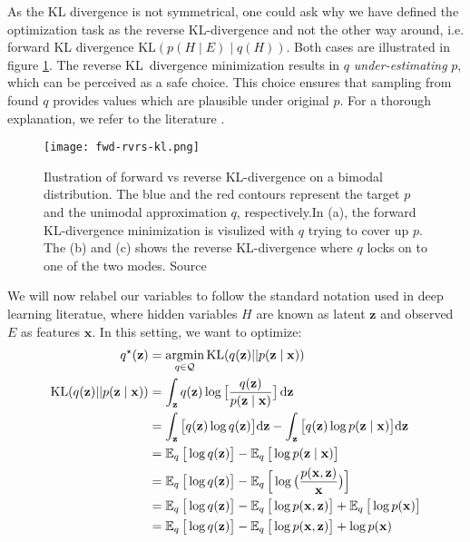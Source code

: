 As the KL divergence is not symmetrical, one could ask why we have defined the optimization task as the reverse KL-divergence and not the other way
around, i.e. forward KL divergence $\mathrm{KL}(p(H \mid E) \mid q(H))$. Both cases are illustrated in figure \ref{fig:forward-reverse}. The reverse 
KL~divergence minimization results in $q$ \textit{under-estimating} $p$, which can be perceived as a safe choice. This choice ensures that sampling
from found $q$ provides values which are plausible under original $p$. For a thorough explanation, we refer to the literature 
\cite{another-vb-intro-2021}.
\begin{figure}[t]
    \centering
    \texttt{[image: fwd-rvrs-kl.png]}
    \caption[Forward vs reverse KL divergence]{Ilustration of forward vs reverse KL-divergence on a bimodal distribution. The blue and the red contours represent the target $p$ 
    and the unimodal approximation $q$, respectively.In (a), the forward KL-divergence minimization is visulized with $q$ trying to cover up $p$.
    The (b) and (c) shows the reverse KL-divergence where $q$ locks on to one of the two modes. Source \cite{another-vb-intro-2021}}
    \label{fig:forward-reverse}
\end{figure}
We will now relabel our variables to follow
the standard notation used in deep learning literatue, where hidden variables $H$ are known as latent $\mathbf{z}$ and observed $E$ as features $\mathbf{x}$. 
In this setting, we want to optimize:
\begin{align}
    \label{eq:variational_bayes}
    q^\star(\mathbf{z}) &= \mathop{\rm argmin}_{q \in \mathcal{Q}} \mathrm{KL}(q(\mathbf{z}) || p(\mathbf{z} \mid \mathbf{x})) \\
    \mathrm{KL}(q(\mathbf{z}) || p(\mathbf{z} \mid \mathbf{x})) &= \int_\mathbf{z} q(\mathbf{z}) \log \big[ \frac{q(\mathbf{z})}{p(\mathbf{z}\mid\mathbf{x})} \big]\,\mbox{\rm d}\mathbf{z} \\
    &= \int_\mathbf{z} \big[q(\mathbf{z}) \log q(\mathbf{z})\big] \mbox{\rm d}\mathbf{z} - \int_\mathbf{z}  \big[q(\mathbf{z}) \log p(\mathbf{z}\mid \mathbf{x})\big] \mbox{\rm d}\mathbf{z} \\
    &= \operatorname{\mathbb{E}}_q \big[\log q(\mathbf{z})\big] - \operatorname{\mathbb{E}}_q \big[\log p(\mathbf{z}\mid \mathbf{x})\big] \\
    &= \operatorname{\mathbb{E}}_q \big[\log q(\mathbf{z})\big] - \operatorname{\mathbb{E}}_q \Big[\log \big( \frac{p(\mathbf{x},\mathbf{z})}{\mathbf{x}}\big) \Big] \\
    &= \operatorname{\mathbb{E}}_q \big[\log q(\mathbf{z})\big] - \operatorname{\mathbb{E}}_q \big[\log p(\mathbf{x},\mathbf{z})\big] + \operatorname{\mathbb{E}}_q \big[\log p(\mathbf{x})\big] \\
    &= \operatorname{\mathbb{E}}_q \big[\log q(\mathbf{z})\big] - \operatorname{\mathbb{E}}_q \big[\log p(\mathbf{x},\mathbf{z})\big] + \log p(\mathbf{x})
\end{align}
